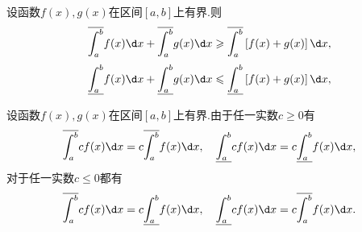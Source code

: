 \begin{proposition}[下积分的超可加性与上积分的次可加性]
	设函数$f(x),g(x)$在区间$\left[a,b\right]$上有界.则
	$$\overline{\int_{a}^{b}}f(x)\d x+\overline{\int_{a}^{b}}g(x)\d x\geqslant\overline{\int_{a}^{b}}\left[f(x)+g(x)\right]\d x,$$
	$$\underline{\int_{a}^{b}}f(x)\d x+\underline{\int_{a}^{b}}g(x)\d x\leqslant\underline{\int_{a}^{b}}\left[f(x)+g(x)\right]\d x,$$
\end{proposition}
\begin{proposition}
	设函数$f(x),g(x)$在区间$\left[a,b\right]$上有界.由于任一实数$c\geqslant 0$有
	$$\overline{\int_{a}^{b}}cf(x)\d x=c\overline{\int_{a}^{b}}f(x)\d x,\quad\underline{\int_{a}^{b}}cf(x)\d x=c\underline{\int_{a}^{b}}f(x)\d x,$$
	对于任一实数$c\leqslant 0$都有
	$$\overline{\int_{a}^{b}}cf(x)\d x=c\underline{\int_{a}^{b}}f(x)\d x,\quad\underline{\int_{a}^{b}}cf(x)\d x=c\overline{\int_{a}^{b}}f(x)\d x.$$
\end{proposition}

